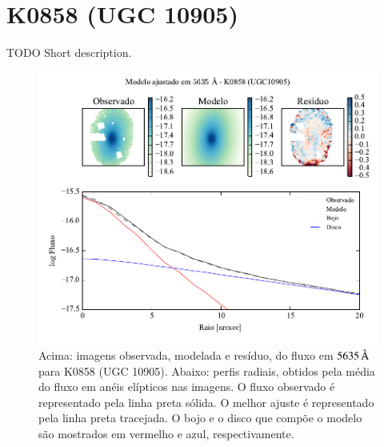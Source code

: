 
\section{K0858 (UGC 10905)}
\label{apendice:Decomp:K00858}

TODO Short description.

\begin{figure}
	\includegraphics[page=1]{figuras-decomp/K0858_sample006a}
	\caption[Ajuste morfológico em $5635\,\angstrom$ de K0858 (UGC 10905)]
	{Acima: imagens observada, modelada e resíduo, do fluxo em $5635\,\angstrom$
	para K0858 (UGC 10905). Abaixo: perfis radiais, obtidos pela média do fluxo em
	anéis elípticos nas imagens. O fluxo observado é representado pela linha preta
	sólida. O melhor ajuste é representado pela linha preta tracejada. O bojo e o
	disco que compõe o modelo são mostrados em vermelho e azul, respectivamente.}
	\label{fig:decompRadprof:K0858}
\end{figure}

